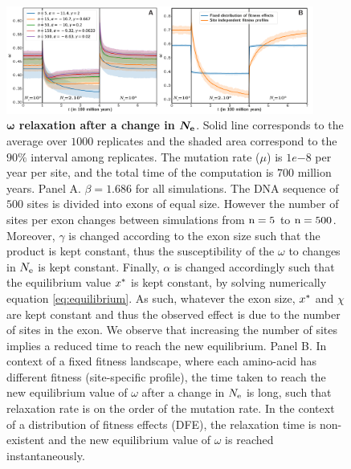 \documentclass{article}
\begin{document}
	\begin{figure}[htb!]
		\begin{mdframed}
			\centering
			\includegraphics[width=0.9\textwidth] {artworks/Relaxation.pdf}
			\caption{
				\textbf{$\bm{\omega}$ relaxation after a change in $\bm{N_{\mathrm{e}}}$}.
				Solid line corresponds to the average over $1000$ replicates and the shaded area correspond to the $90\%$ interval among replicates. 
				The mutation rate ($\mu$) is $1e{-8}$ per year per site, and the total time of the computation is $700$ million years.
				Panel A. 
				$\beta=1.686$ for all simulations.
				The DNA sequence of $500$ sites is divided into exons of equal size.
				However the number of sites per exon changes between simulations from $\text{n}=5$ to $\text{n}=500$.
				Moreover, $\gamma$ is changed according to the exon size such that the product is kept constant, thus the susceptibility of the $\omega$ to changes in $N_{\mathrm{e}}$ is kept constant.
				Finally, $\alpha$ is changed accordingly such that the equilibrium value $x^{*}$ is kept constant, by solving numerically equation \ref{eq:equilibrium}.
				As such, whatever the exon size, $x^{*}$ and $\chi$ are kept constant and thus the observed effect is due to the number of sites in the exon.
				We observe that increasing the number of sites implies a reduced time to reach the new equilibrium.
				Panel B. In context of a fixed fitness landscape, where each amino-acid has different fitness (site-specific profile), the time taken to reach the new equilibrium value of $\omega$ after a change in $N_{\mathrm{e}}$ is long, such that relaxation rate is on the order of the mutation rate. In the context of a distribution of fitness effects (DFE), the relaxation time is non-existent and the new equilibrium value of $\omega$ is reached instantaneously.
			}
			\label{fig:relaxStability}
		\end{mdframed}
	\end{figure}
		
	
\end{document}
